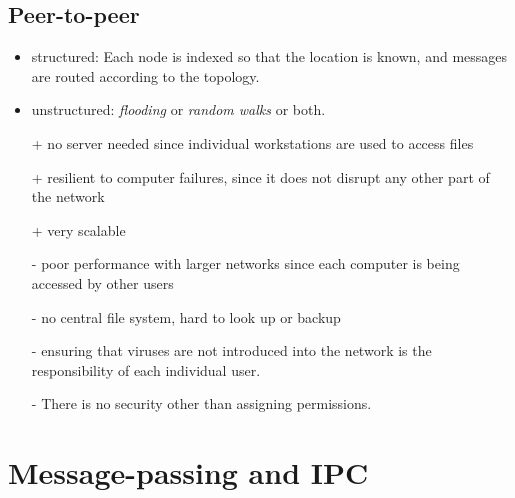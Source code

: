 \documentclass[twocolumn,landscape,10pt]{article}
\theoremstyle{definition}
\begin{document}
\subsection{Peer-to-peer}
\begin{itemize}
    \item structured: Each node is indexed so that the location is
        known, and messages are routed according to the topology.
    \item unstructured: \emph{flooding} or \emph{random walks} or both.
    \item[+] no server needed since individual workstations are used to
        access files
    \item[+] resilient to computer failures, since it does not disrupt
        any other part of the network
    \item[+] very scalable
    \item[-] poor performance with larger networks since each computer is being
        accessed by other users
    \item[-] no central file system, hard to look up or backup
    \item[-] ensuring that viruses are not introduced into the network
        is the responsibility of each individual user.
    \item[-] There is no security other than assigning permissions.
\end{itemize} 

\section{Message-passing and IPC}
\end{document}
